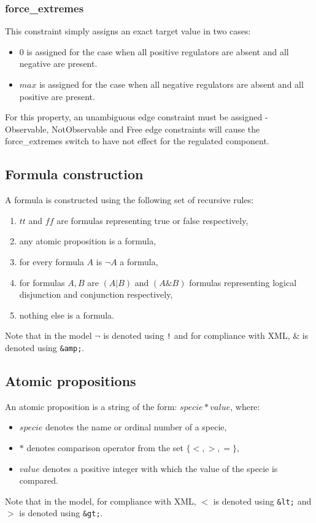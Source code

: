 \documentclass[12pt]{article}
\begin{document}
\subsubsection{force\_extremes}
This constraint simply assigns an exact target value in two cases:
\begin{itemize}
\item $0$ is assigned for the case when all positive regulators are absent and all negative are present.
 \item $max$ is assigned for the case when all negative regulators are absent and all positive are present.
\end{itemize}
For this property, an unambiguous edge constraint must be assigned - Observable, NotObservable and Free edge constraints will cause the force\_extremes switch to have not effect for the regulated component.

\subsection{Formula construction}
\label{FormulaConstruction}
A formula is constructed using the following set of recursive rules:
\begin{enumerate}
\item $tt$ and $ff$ are formulas representing true or false respectively,
\item any atomic proposition is a formula,
\item for every formula $A$ is $\neg A$ a formula,
\item for formulas $A,B$ are $(A|B)$ and $(A\&B)$ formulas representing logical disjunction and conjunction respectively,
\item nothing else is a formula.
\end{enumerate}
Note that in the model $\neg$ is denoted using \texttt{!} and for compliance with XML, $\&$ is denoted using \texttt{\&amp;}.

\subsection{Atomic propositions}
\label{AtomicPropositions}
An atomic proposition is a string of the form: $specie*value$, where:
\begin{itemize}
\item $specie$ denotes the name or ordinal number of a specie,
\item $*$ denotes comparison operator from the set $\{<,>,=\}$,
\item $value$ denotes a positive integer with which the value of the specie is compared.
\end{itemize}
Note that in the model, for compliance with XML, $<$ is denoted using \texttt{\&lt;} and $>$ is denoted using \texttt{\&gt;}.



\end{document}
